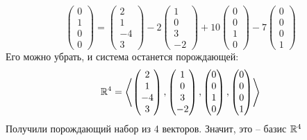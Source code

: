 $$
\begin{pmatrix}
	0 \\
    1 \\
    0 \\
    0
\end{pmatrix} =
\begin{pmatrix}
	2 \\
    1 \\
    -4 \\
    3
\end{pmatrix} -2
\begin{pmatrix}
	1 \\
    0 \\
    3 \\
    -2
\end{pmatrix} + 10
\begin{pmatrix}
	0 \\
    0 \\
    1 \\
    0
\end{pmatrix} -7
\begin{pmatrix}
	0 \\
    0 \\
    0 \\
    1
\end{pmatrix} $$
Его можно убрать, и система останется порождающей:
$$ \mathbb{R}^4 = \left\langle
\begin{pmatrix}
	2 \\
    1 \\
    -4 \\
    3
\end{pmatrix},
\begin{pmatrix}
	1 \\
    0 \\
    3 \\
    -2
\end{pmatrix},
\begin{pmatrix}
	0 \\
    0 \\
    1 \\
    0
\end{pmatrix},
\begin{pmatrix}
	0 \\
    0 \\
    0 \\
    1
\end{pmatrix} \right\rangle $$
Получили порождающий набор из 4 векторов. Значит, это -- базис $ \mathbb{R}^4 $


